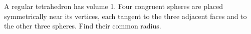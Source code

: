 A regular tetrahedron has volume 1. Four congruent spheres are placed symmetrically near its vertices, each tangent to the three adjacent faces and to the other three spheres. Find their common radius.
